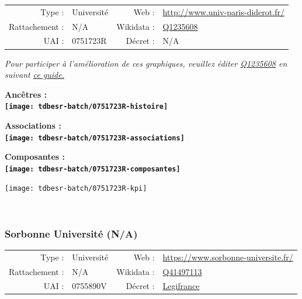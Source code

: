 \documentclass[12pt,french,]{article}
\begin{document}
\begin{tabular*}{\textwidth}{rp{5cm}rl}  
\hline  
Type : & Université & Web : &\href{http://www.univ-paris-diderot.fr/}{http://www.univ-paris-diderot.fr/} \\  
Rattachement : & N/A & Wikidata : & \href{https://www.wikidata.org/entity/Q1235608}{Q1235608} \\  
UAI : & 0751723R & Décret : & N/A \\  
\hline  
\end{tabular*}

\textit{\scriptsize Pour participer à l'amélioration de ces graphiques, veuillez éditer  \href{https://www.wikidata.org/entity/Q1235608}{Q1235608}  en suivant \href{https://github.com/cpesr/wikidataESR/blob/master/Rmd/wikidataESR.md}{ce guide.}}

\vspace{1cm}  
\begin{minipage}[b]{0.50\textwidth}\begin{center} \bf Ancêtres : \\  
\texttt{[image: tdbesr-batch/0751723R-histoire]} \end{center}\end{minipage}\begin{minipage}[b]{0.50\textwidth}\begin{center} \bf Associations : \\  
\texttt{[image: tdbesr-batch/0751723R-associations]} \end{center}\end{minipage}

\hrulefill

\begin{center} \bf Composantes : \\  
\texttt{[image: tdbesr-batch/0751723R-composantes]} \end{center}

\begin{center}\texttt{[image: tdbesr-batch/0751723R-kpi]} \end{center}\checkoddpage

\ifoddpage ~\newpage \fi   

\hypertarget{sorbonne-universituxe9-na}{%
\subsubsection{Sorbonne Université
(N/A)}\label{sorbonne-universituxe9-na}}

\begin{tabular*}{\textwidth}{rp{5cm}rl}  
\hline  
Type : & Université & Web : &\href{https://www.sorbonne-universite.fr/}{https://www.sorbonne-universite.fr/} \\  
Rattachement : & N/A & Wikidata : & \href{https://www.wikidata.org/entity/Q41497113}{Q41497113} \\  
UAI : & 0755890V & Décret : & \href{https://www.legifrance.gouv.fr/affichTexte.do?cidTexte=JORFTEXT000034455357&categorieLien=id}{Legifrance} \\  
\hline  
\end{tabular*}
\end{document}
